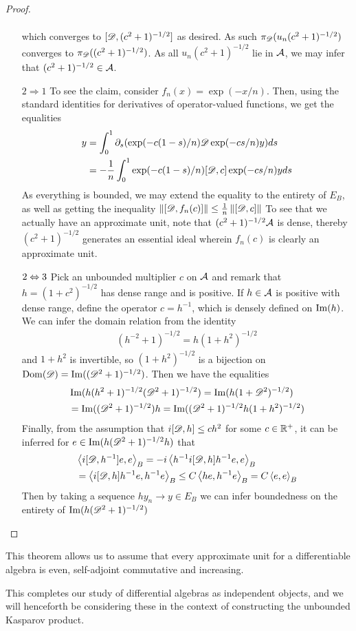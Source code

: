 \begin{proof}
\begin{itemize}
\begin{align*}
		\end{align*}
		which converges to $[\mathscr{D},(c^2+1)^{-1/2}]$ as desired. As such $\pi_{\mathscr{D}}(u_n(c^2+1)^{-1/2})$ converges to $\pi_{\mathscr{D}}((c^2+1)^{-1/2})$. As all $u_n(c^2+1)^{-1/2}$ lie in $\mathcal{A}$, we may infer that $(c^2+1)^{-1/2}\in \mathcal{A}$. 
	\item[$2\Rightarrow 1$]
		To see the claim, consider $f_n(x)=\exp(-x/n)$. Then, using the standard identities for derivatives of operator-valued functions, we get the equalities
		\begin{align*}
			[\D,f_n(c)]y&=\int_0^1 \part_s (\exp(-c(1-s)/n)\D \exp(-cs/n)y)ds \\
			&=-\frac{1}{n}\int_0^1 \exp(-c(1-s)/n)[\D,c]\exp(-cs/n)yds 
		\end{align*}
		As everything is bounded, we may extend the equality to the entirety of $E_B$, as well as getting the inequality $\left \Vert [\mathscr{D},f_n(c)] \right \Vert\leq \frac{1}{n}\left \Vert [\mathscr{D},c] \right \Vert$
		To see that we actually have an approximate unit, note that $(c^2+1)^{-1/2}\mathcal{A}$ is dense, thereby $(c^2+1)^{-1/2}$ generates an essential ideal wherein $f_n(c)$ is clearly an approximate unit. 
	\item[$2\Leftrightarrow 3$]
		Pick an unbounded multiplier $c$ on $\mathcal{A}$ and remark that $h=(1+c^2)^{-1/2}$ has dense range and is positive. If $h\in \mathcal{A}$ is positive with dense range, define the operator $c=h^{-1}$, which is densely defined on $\operatorname{Im}(h)$. We can infer the domain relation from the identity
		\begin{align*}
			(h^{-2}+1)^{-1/2}=h(1+h^2)^{-1/2}
		\end{align*}
		and $1+h^2$ is invertible, so $(1+h^2)^{-1/2}$ is a bijection on $\operatorname{Dom}(\mathscr{D})=\operatorname{Im}( (\mathscr{D}^2+1)^{-1/2})$. Then we have the equalities
		\begin{align*}
			&\operatorname{Im}(h(h^2+1)^{-1/2}(\mathscr{D}^2+1)^{-1/2})=\operatorname{Im} (h(1+\mathscr{D}^2)^{-1/2}) \\
			&=\operatorname{Im} ((\mathscr{D}^2+1)^{-1/2}) h=\operatorname{Im} ((\mathscr{D}^2+1)^{-1/2}h(1+h^2)^{-1/2})
		\end{align*}
		Finally, from the assumption that $i[\mathscr{D},h]\leq ch^2$ for some $c\in \mathbb{R}^+$, it can be inferred for $e\in \operatorname{Im}(h(\mathscr{D}^2+1)^{-1/2}h)$ that
		\begin{align*}
			&\left \langle i[\mathscr{D},h^{-1}]e,e \right \rangle_B=-i\left \langle h^{-1}i[\mathscr{D},h]h^{-1}e,e \right \rangle_B \\
			&=\left \langle i[\mathscr{D},h]h^{-1}e,h^{-1}e \right \rangle_B\leq C\left \langle he,h^{-1}e \right \rangle_B=C\left \langle e,e \right \rangle_B
		\end{align*}
		Then by taking a sequence $hy_n\to y\in E_B$ we can infer boundedness on the entirety of $\operatorname{Im}(h(\mathscr{D}^2+1)^{-1/2})$
\end{itemize}
\end{proof}
\begin{remark}
This theorem allows us to assume that every approximate unit for a differentiable algebra is even, self-adjoint commutative and increasing.
\end{remark} This completes our study of differential algebras as independent objects, and we will henceforth be considering these in the context of constructing the unbounded Kasparov product.